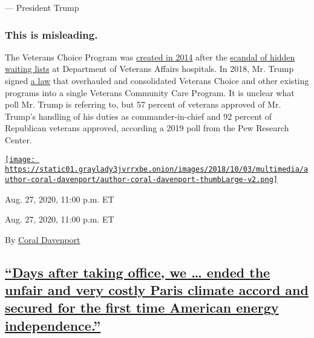 --- President Trump

\hypertarget{this-is-misleading--4}{%
\subsubsection{\texorpdfstring{\textbf{This is misleading.}
}{This is misleading. }}\label{this-is-misleading--4}}

The Veterans Choice Program was
\href{https://www.congress.gov/bill/113th-congress/house-bill/3230}{created
in 2014} after the
\href{https://www.nytimes3xbfgragh.onion/2014/05/29/us/va-report-confirms-improper-waiting-lists-at-phoenix-center.html?module=inline}{scandal
of hidden waiting lists} at Department of Veterans Affairs hospitals. In
2018, Mr. Trump signed
\href{https://www.nytimes3xbfgragh.onion/2018/05/23/us/politics/veterans-health-care.html?module=inline}{a
law} that overhauled and consolidated Veterans Choice and other existing
programs into a single Veterans Community Care Program. It is unclear
what poll Mr. Trump is referring to, but 57 percent of veterans approved
of Mr. Trump's handling of his duties as commander-in-chief and 92
percent of Republican veterans approved, according a 2019 poll from the
Pew Research Center.

\href{https://www.nytimes3xbfgragh.onion/by/coral-davenport}{\texttt{[image: https://static01.graylady3jvrrxbe.onion/images/2018/10/03/multimedia/author-coral-davenport/author-coral-davenport-thumbLarge-v2.png]}}

Aug. 27, 2020, 11:00 p.m. ET

Aug. 27, 2020, 11:00 p.m. ET

By \href{https://www.nytimes3xbfgragh.onion/by/coral-davenport}{Coral
Davenport}

\hypertarget{days-after-taking-office-we--ended-the-unfair-and-very-costly-paris-climate-accord-and-secured-for-the-first-time-american-energy-independence}{%
\subsection{\texorpdfstring{\protect\hyperlink{days-after-taking-office-we-ended-the-unfair-and-very-costly-paris-climate-accord-and-secured-for-the-first-time-american-energy}{``Days
after taking office, we \ldots{} ended the unfair and very costly Paris
climate accord and secured for the first time American energy
independence.''}}{``Days after taking office, we \ldots{} ended the unfair and very costly Paris climate accord and secured for the first time American energy independence.''}}\label{days-after-taking-office-we--ended-the-unfair-and-very-costly-paris-climate-accord-and-secured-for-the-first-time-american-energy-independence}}

